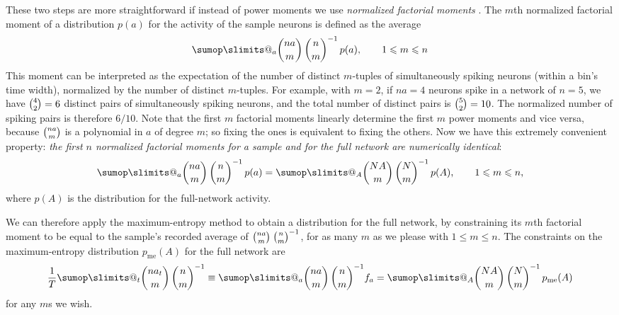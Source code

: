 \documentclass[\ifafour a4paper,12pt,\else a5paper,10pt,\fi%
onecolumn,oneside,article,%
british%
]{memoir}
\makeatletter
\theoremstyle{remark}
\theoremstyle{innote}
\def\sum{\DOTSI\sumop\slimits@}
\newcommand*{\citep}{\parencites}
\renewcommand*{\le}{\leqslant}%
\newcommand*{\E}{\mathrm{E}}
\renewcommand*{\|}{\nonscript\,\vert\nonscript\;\mathopen{}}
\newcommand*{\yAv}{A}
\newcommand*{\yav}{a}
\newcommand*{\yff}{f}
\newcommand*{\ya}{\yav}%
\newcommand*{\yA}{\yAv}%
\newcommand*{\yH}{\varIota}
\newcommand*{\px}{p_{\text{me}}}
\newcommand*{\pxx}{p}
\makeatother
\begin{document}
These two steps are more straightforward if instead of power moments we use
\emph{normalized factorial moments} \citep{potts1953}. The $m$th normalized
factorial moment of a distribution $\pxx(\ya)$ for the activity of the
sample neurons is defined as the average
\begin{equation}
  \sum_{\ya} %
  \binom{n \ya}{m}\,  \binom{n}{m}^{-1}\, \pxx(\ya),
  \qquad 1\le m \le n
\end{equation}
This moment can be interpreted as the expectation of the number of distinct
$m$-tuples of simultaneously spiking neurons (within a bin's time width),
normalized by the number of distinct $m$-tuples. For example, with $m=2$,
if $na=4$ neurons spike in a network of $n=5$, we have $\tbinom{4}{2}=6$
distinct pairs of simultaneously spiking neurons, and the total number of
distinct pairs is $\tbinom{5}{2}=10$. The normalized number of spiking
pairs is therefore $6/10$. Note that the first $m$ factorial moments
linearly determine the first $m$ power moments and vice versa, because
$\tbinom{n\ya}{m}$ is a polynomial in $\ya$ of degree $m$; so fixing the
ones is equivalent to fixing the others. Now we have this extremely
convenient property: \emph{the first $n$ normalized factorial moments for a
  sample and for the full network are numerically identical}:
\begin{equation}
  \label{eq:equal_m_factorialmoments}
    \sum_{\ya} %
  \binom{n \ya}{m}\,  \binom{n}{m}^{-1}\, \pxx(\ya)
=    \sum_{\yA} %
  \binom{N \yA}{m}\,  \binom{N}{m}^{-1}\, \pxx(\yA),
  \qquad 1\le m \le n,
\end{equation}
where $\pxx(\yA)$ is the distribution for the full-network activity.

We can therefore apply the maximum-entropy method to obtain a distribution
for the full network, by constraining its $m$th factorial moment to be
equal to the sample's recorded average of
$\tbinom{n\ya}{m}\;\tbinom{n}{m}^{-1}$, for as many $m$ as we please with
$1\le m \le n$. The constraints on the maximum-entropy distribution
$\px(\yA)$ for the full network are
\begin{equation}
  \label{eq:final_constraint}
  \frac{1}{T}\sum_{t}\binom{n\ya_{t}}{m}\,\binom{n}{m}^{-1}
  \equiv
   \sum_{\ya}
  \binom{n \ya}{m}\,  \binom{n}{m}^{-1} \yff_{\ya}
  =
   \sum_{\yA}
  \binom{N \yA}{m}\,  \binom{N}{m}^{-1}\, \px(\yA)
\end{equation}
for any $m$s we wish.
\end{document}
